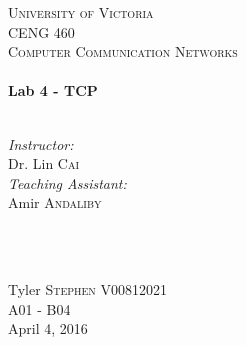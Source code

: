 \begin{titlepage}

\center

\textsc{\LARGE University of Victoria}\\[1cm] 	%
\textsc{\Large CENG 460}\\[0.5cm] 			%
\textsc{\large Computer Communication Networks}\\[0.5cm] 		%


\HRule\\[0.4cm]
{\huge \bfseries Lab 4 - TCP}\\[0.2cm] %
\HRule\\[1.5cm]


\begin{minipage}{0.7\textwidth}
\begin{flushleft}

\large\emph{Instructor:} \\
Dr. Lin \textsc{Cai} \\
\vspace{12 pt}
\emph{Teaching Assistant:} \\
Amir \textsc{Andaliby}

\end{flushleft}
\end{minipage}
~
\begin{minipage}{0.1\textwidth}
\begin{flushright} \large

\vspace{12 pt}

\end{flushright}
\end{minipage}\\[2cm]


\Large Tyler \textsc{Stephen}
\large V00812021	\\
A01 - B04\\[1.5cm] 


{\large April 4, 2016}\\ %

\begin{figure}[b]	 %
	\centering
\end{figure}

\end{titlepage}

